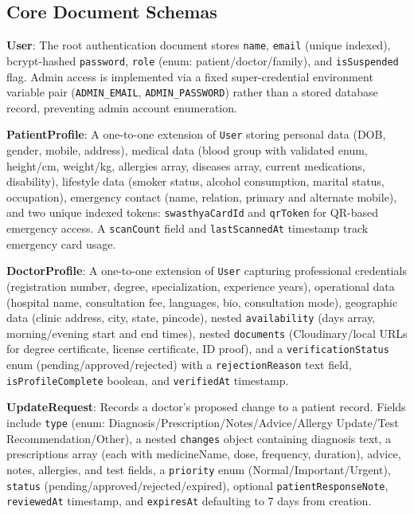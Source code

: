 \subsection{Core Document Schemas}

\textbf{User}: The root authentication document stores \texttt{name}, \texttt{email} (unique indexed), bcrypt-hashed \texttt{password}, \texttt{role} (enum: patient/doctor/family), and \texttt{isSuspended} flag. Admin access is implemented via a fixed super-credential environment variable pair (\texttt{ADMIN\_EMAIL}, \texttt{ADMIN\_PASSWORD}) rather than a stored database record, preventing admin account enumeration.

\textbf{PatientProfile}: A one-to-one extension of \texttt{User} storing personal data (DOB, gender, mobile, address), medical data (blood group with validated enum, height/cm, weight/kg, allergies array, diseases array, current medications, disability), lifestyle data (smoker status, alcohol consumption, marital status, occupation), emergency contact (name, relation, primary and alternate mobile), and two unique indexed tokens: \texttt{swasthyaCardId} and \texttt{qrToken} for QR-based emergency access. A \texttt{scanCount} field and \texttt{lastScannedAt} timestamp track emergency card usage.

\textbf{DoctorProfile}: A one-to-one extension of \texttt{User} capturing professional credentials (registration number, degree, specialization, experience years), operational data (hospital name, consultation fee, languages, bio, consultation mode), geographic data (clinic address, city, state, pincode), nested \texttt{availability} (days array, morning/evening start and end times), nested \texttt{documents} (Cloudinary/local URLs for degree certificate, license certificate, ID proof), and a \texttt{verificationStatus} enum (pending/approved/rejected) with a \texttt{rejectionReason} text field, \texttt{isProfileComplete} boolean, and \texttt{verifiedAt} timestamp.

\textbf{UpdateRequest}: Records a doctor's proposed change to a patient record. Fields include \texttt{type} (enum: Diagnosis/Prescription/Notes/Advice/Allergy Update/Test Recommendation/Other), a nested \texttt{changes} object containing diagnosis text, a prescriptions array (each with medicineName, dose, frequency, duration), advice, notes, allergies, and test fields, a \texttt{priority} enum (Normal/Important/Urgent), \texttt{status} (pending/approved/rejected/expired), optional \texttt{patientResponseNote}, \texttt{reviewedAt} timestamp, and \texttt{expiresAt} defaulting to 7 days from creation.

